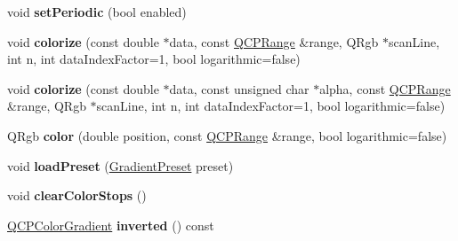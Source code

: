 \begin{DoxyCompactItemize}
\item 
\mbox{\label{class_q_c_p_color_gradient_a39d6448155fc00a219f239220d14bb39}} 
void {\bfseries set\+Periodic} (bool enabled)
\item 
\mbox{\label{class_q_c_p_color_gradient_aaf423ceb943e177b0ed2c48c811d83dc}} 
void {\bfseries colorize} (const double $\ast$data, const \hyperlink{class_q_c_p_range}{Q\+C\+P\+Range} \&range, Q\+Rgb $\ast$scan\+Line, int n, int data\+Index\+Factor=1, bool logarithmic=false)
\item 
\mbox{\label{class_q_c_p_color_gradient_acf0cc7fba83ef21f7b8d5d5258519db3}} 
void {\bfseries colorize} (const double $\ast$data, const unsigned char $\ast$alpha, const \hyperlink{class_q_c_p_range}{Q\+C\+P\+Range} \&range, Q\+Rgb $\ast$scan\+Line, int n, int data\+Index\+Factor=1, bool logarithmic=false)
\item 
\mbox{\label{class_q_c_p_color_gradient_a0599545c859268b025d2060dea741cea}} 
Q\+Rgb {\bfseries color} (double position, const \hyperlink{class_q_c_p_range}{Q\+C\+P\+Range} \&range, bool logarithmic=false)
\item 
\mbox{\label{class_q_c_p_color_gradient_aa0aeec1528241728b9671bf8e60b1622}} 
void {\bfseries load\+Preset} (\hyperlink{class_q_c_p_color_gradient_aed6569828fee337023670272910c9072}{Gradient\+Preset} preset)
\item 
\mbox{\label{class_q_c_p_color_gradient_a939213e85f0d1279519d555c5fcfb6ad}} 
void {\bfseries clear\+Color\+Stops} ()
\item 
\mbox{\label{class_q_c_p_color_gradient_a9f72f501de429829ec446333316decda}} 
\hyperlink{class_q_c_p_color_gradient}{Q\+C\+P\+Color\+Gradient} {\bfseries inverted} () const
\end{DoxyCompactItemize}
